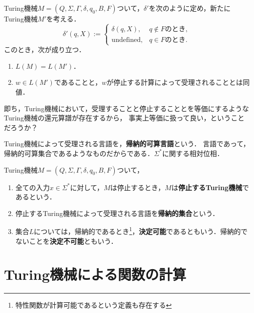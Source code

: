 \begin{proposition}[Turing機械における停止の概念]\label{prop-haltness-in-Turing-machine}
    Turing機械$M=(Q,\Sigma,\Gamma,\delta,q_0,B,F)$ついて，$\delta'$を次のように定め，新たにTuring機械$M'$を考える．
    \[\delta'(q,X):=\begin{cases}
        \delta(q,X),&q\notin Fのとき,\\
        \mathrm{undefined},&q\in Fのとき.
    \end{cases}\]
    このとき，次が成り立つ．
    \begin{enumerate}
        \item $L(M)=L(M')$．
        \item $w\in L(M')$であることと，$w$が停止する計算によって受理されることとは同値．
    \end{enumerate}
\end{proposition}
\begin{remarks}
    即ち，Turing機械において，受理することと停止することとを等価にするようなTuring機械の還元算譜が存在するから，
    事実上等価に扱って良い，ということだろうか？
\end{remarks}

\begin{definition}
    Turing機械によって受理される言語を，\textbf{帰納的可算言語}という．
    言語であって，帰納的可算集合であるようなものだからである．$\Sigma^*$に関する相対位相．
\end{definition}

\begin{definition}
    Turing機械$M=(Q,\Sigma,\Gamma,\delta,q_0,B,F)$ついて，
    \begin{enumerate}
        \item 全ての入力$x\in\Sigma^*$に対して，$M$は停止するとき，$M$は\textbf{停止するTuring機械}であるという．
        \item 停止するTuring機械によって受理される言語を\textbf{帰納的集合}という．
        \item 集合$L$については，帰納的であるとき\footnote{特性関数が計算可能であるという定義も存在する}，\textbf{決定可能}であるともいう．帰納的でないことを\textbf{決定不可能}ともいう．
    \end{enumerate}
\end{definition}

\section{Turing機械による関数の計算}

